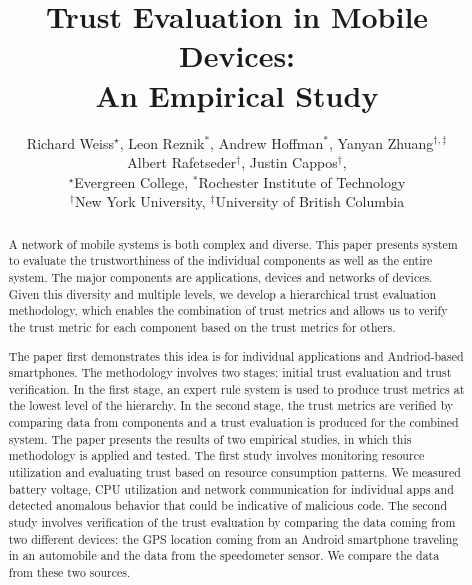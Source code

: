 \documentclass{IEEEtran}
\begin{document}
\title{Trust Evaluation in Mobile Devices: \\An Empirical Study}
\author{Richard Weiss$^{\star}$, Leon Reznik$^*$, Andrew Hoffman$^*$, Yanyan Zhuang$^{\dag, \ddag}$\\
Albert Rafetseder$^{\dag}$, Justin Cappos$^{\dag}$, \\
$^{\star}$Evergreen College, $^*$Rochester Institute of Technology\\
$^{\dag}$New York University, $^{\ddag}$University of British Columbia}

\maketitle


\begin{abstract}
A network of mobile systems is both complex and diverse.  This paper presents 
system to evaluate the trustworthiness of the individual components as well as the entire system. 
The major components are applications, devices and networks of devices.  
Given this diversity and multiple levels, we develop
a hierarchical trust evaluation methodology, which enables the combination of trust metrics 
and allows us to verify the trust metric for each component
based on the trust metrics for others.

The paper first demonstrates this idea is for individual applications and Andriod-based smartphones.
The methodology involves two stages: initial trust evaluation and trust verification.
In the first stage, an expert rule system is used to produce trust metrics at the lowest level of
the hierarchy.  In the second stage, the trust metrics are verified
by comparing data from components and a trust evaluation is produced for the 
combined system.  The paper presents the results of two empirical studies, in which 
this methodology is applied and tested. The first study involves 
monitoring resource utilization and evaluating trust based on 
resource consumption patterns. We measured battery voltage, CPU utilization and network communication
for individual apps and detected anomalous behavior that could be indicative of malicious code.
The second study involves verification of the trust evaluation by 
comparing the data coming from two different devices: the 
GPS location coming from an Android smartphone traveling in an automobile and the data from the speedometer
sensor.  We compare the data from these two sources.


\end{abstract}
\end{document}
